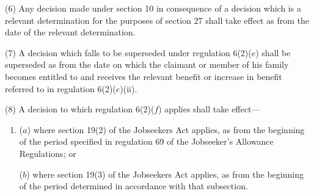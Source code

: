 \documentclass[12pt,a4paper]{article}
\begin{document}
(6) Any decision made under section 10 in consequence of a decision which is a relevant determination for the purposes of section 27 shall take effect as from the date of the relevant determination.


(7) A decision which falls to be superseded under regulation 6(2)($e$)  shall be superseded as from the date on which the claimant or member of his family becomes entitled to and receives the relevant benefit or increase in benefit referred to in regulation 6(2)($e$)(ii).

%

(8) A decision to which regulation 6(2)($f$)  applies shall take effect—
\begin{enumerate}\item[]
($a$) where section 19(2) of the Jobseekers Act applies, as from the beginning of the period specified in regulation 69 of the Jobseeker’s Allowance Regulations; or

($b$) where section 19(3) of the Jobseekers Act applies, as from the beginning of the period determined in accordance with that subsection.
\end{enumerate}
\end{document}
